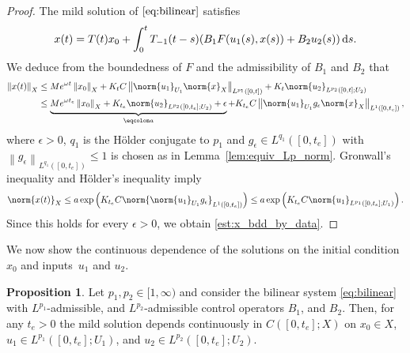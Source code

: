 \documentclass{cocv}
\newcommand{\ds}{ {\, \rm d} s}
\newcommand{\nm}[2][]{\left\lVert #2 \right\rVert_{#1}}
\theoremstyle{definition}
\newtheorem{proposition}{Proposition}
\begin{document}
\begin{proof}
The mild solution of $\eqref{eq:bilinear}$ satisfies
\begin{equation*}
    x(t)=T(t)x_0 +\int_{0}^t T_{-1}(t-s)(B_1F(u_1(s),x(s)) + B_2u_2(s)) \ds.
\end{equation*}
We deduce from the boundedness of $F$ and the admissibility of $B_1$ and $B_2$ that
\begin{equation*}
    \begin{aligned}
        \nm[X]{x(t)}&\leq Me^{\omega t}\nm[X]{x_0} + K_t C \nm[L^{p_1}({[0, t]})]{\norm{u_1}_{U_1} \norm{x}_X} + K_t \norm{u_2}_{L^{p_2}([0,t]; U_2)}\\
        & \leq \underbrace{Me^{\omega t_e}\nm[X]{x_0} + K_{t_e} \norm{u_2}_{L^{p_2}([0,t_e]; U_2)} +\epsilon}_{ \eqcolon a} + K_{t_e}C\nm[L^1({[0,t_e]})]{\norm{u_1}_{U_1} g_\epsilon \norm{x}_X},
    \end{aligned}
\end{equation*}
where $\epsilon > 0$, $q_1$ is the H\"older conjugate to $p_1$ and $g_\epsilon \in L^{q_1}([0,t_e])$  with $\nm[L^{q_1}{([0,t_e])}]{g_\epsilon} \le 1$ is chosen as in Lemma~\ref{lem:equiv_Lp_norm}. Gronwall's inequality and H\"older's inequality imply
\begin{equation*}
    \norm{x(t)}_X \le a \exp\left(K_{t_e}C \norm{\norm{u_1}_{U_1} g_\epsilon}_{L^1([0,t_e])}\right) \le a\exp\left(K_{t_e}C \norm{u_1}_{L^{p_1}([0,t_e];U_1)}\right).
\end{equation*}
Since this holds for every $\epsilon>0$, we obtain \eqref{est:x_bdd_by_data}.
\end{proof}
We now show the continuous dependence of the solutions on the initial condition $x_0$ and inputs~$u_1$ and $u_2$. 
\begin{proposition}\label{pr:continuous_dependence}
    Let $p_1,p_2 \in [1,\infty)$ and consider the bilinear system \eqref{eq:bilinear} with $L^{p_1}$-admissible, and $L^{p_2}$-admissible control operators $B_1$, and $ B_2$. Then, for any $t_e > 0$ the mild solution depends continuously in $C([0, t_e];X)$ on $x_0 \in X$, $u_1 \in L^{p_1}([0, t_e];U_1)$, and $u_2 \in L^{p_2}([0, t_e];U_2)$.  
\end{proposition}
\end{document}
